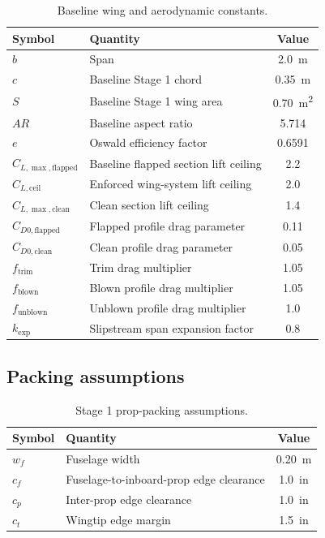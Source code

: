 \documentclass[11pt]{article}
\begin{document}
\begin{table}[h]
\centering
\begin{tabular}{llc}
\toprule
Symbol & Quantity & Value \\
\midrule
\(b\) & Span & \SI{2.0}{m} \\
\(c\) & Baseline Stage 1 chord & \SI{0.35}{m} \\
\(S\) & Baseline Stage 1 wing area & \SI{0.70}{m^2} \\
\(AR\) & Baseline aspect ratio & 5.714 \\
\(e\) & Oswald efficiency factor & 0.6591 \\
\(C_{L,\max,\mathrm{flapped}}\) & Baseline flapped section lift ceiling & 2.2 \\
\(C_{L,\mathrm{ceil}}\) & Enforced wing-system lift ceiling & 2.0 \\
\(C_{L,\max,\mathrm{clean}}\) & Clean section lift ceiling & 1.4 \\
\(C_{D0,\mathrm{flapped}}\) & Flapped profile drag parameter & 0.11 \\
\(C_{D0,\mathrm{clean}}\) & Clean profile drag parameter & 0.05 \\
\(f_{\mathrm{trim}}\) & Trim drag multiplier & 1.05 \\
\(f_{\mathrm{blown}}\) & Blown profile drag multiplier & 1.05 \\
\(f_{\mathrm{unblown}}\) & Unblown profile drag multiplier & 1.0 \\
\(k_{\mathrm{exp}}\) & Slipstream span expansion factor & 0.8 \\
\bottomrule
\end{tabular}
\caption{Baseline wing and aerodynamic constants.}
\end{table}

\subsection{Packing assumptions}

\begin{table}[h]
\centering
\begin{tabular}{llc}
\toprule
Symbol & Quantity & Value \\
\midrule
\(w_f\) & Fuselage width & \SI{0.20}{m} \\
\(c_f\) & Fuselage-to-inboard-prop edge clearance & \SI{1.0}{in} \\
\(c_p\) & Inter-prop edge clearance & \SI{1.0}{in} \\
\(c_t\) & Wingtip edge margin & \SI{1.5}{in} \\
\bottomrule
\end{tabular}
\caption{Stage 1 prop-packing assumptions.}
\end{table}
\end{document}
